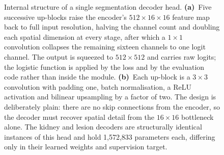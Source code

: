\begin{figure}[htbp]
{}
\caption{Internal structure of a single segmentation decoder head.
\textbf{(a)}~Five successive up-blocks raise the encoder's
$512{\times}16{\times}16$ feature map back to full input resolution, halving the
channel count and doubling each spatial dimension at every stage, after which a
$1{\times}1$ convolution collapses the remaining sixteen channels to one logit
channel. The output is squeezed to $512{\times}512$ and carries raw logits; the
logistic function is applied by the loss and by the evaluation code rather than
inside the module. \textbf{(b)}~Each up-block is a $3{\times}3$ convolution with
padding one, batch normalisation, a ReLU activation and bilinear upsampling by a
factor of two. The design is deliberately plain: there are no skip connections
from the encoder, so the decoder must recover spatial detail from the
$16{\times}16$ bottleneck alone. The kidney and lesion decoders are structurally
identical instances of this head and hold 1,572,833 parameters each, differing
only in their learned weights and supervision target.}\label{fig:decoder}
\end{figure}

